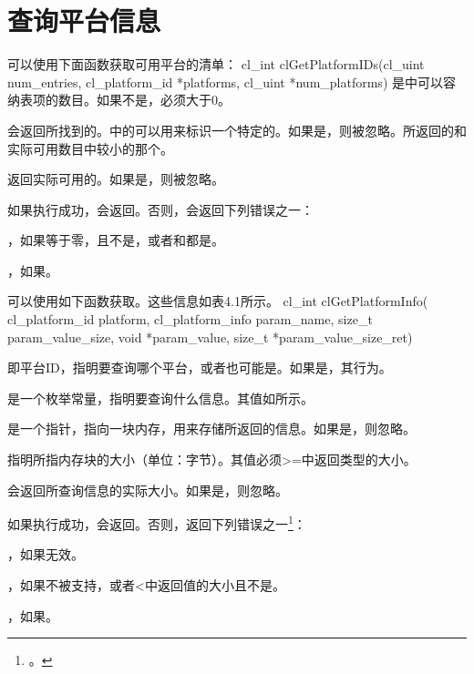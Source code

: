 \section{查询平台信息}
可以使用下面函数获取可用平台的清单：
\startclc
cl_int clGetPlatformIDs(cl_uint num_entries,
			cl_platform_id *platforms,
			cl_uint *num_platforms)
\stopclc
{}是中可以容纳表项的数目。如果不是，必须大于0。

会返回所找到的。中的可以用来标识一个特定的。如果是，则被忽略。所返回的和实际可用数目中较小的那个。

返回实际可用的。如果是，则被忽略。

如果执行成功，会返回。否则，会返回下列错误之一：
\startigBase
\item {}，如果等于零，且不是，或者和都是。
\item {}，如果\schostfailres。
\stopigBase

可以使用如下函数获取。这些信息如表4.1所示。
\startclc
cl_int clGetPlatformInfo(
		cl_platform_id platform,
		cl_platform_info param_name,
		size_t param_value_size,
		void *param_value,
		size_t *param_value_size_ret)
\stopclc

即平台ID，指明要查询哪个平台，或者也可能是。如果是，其行为。

是一个枚举常量，指明要查询什么信息。其值如所示。

是一个指针，指向一块内存，用来存储所返回的信息。如果是，则忽略。

指明所指内存块的大小（单位：字节）。其值必须>=中返回类型的大小。

会返回所查询信息的实际大小。如果是，则忽略。

\cltable
{}
{}

如果执行成功，会返回。否则，返回下列错误之一\footnote{。}：
\startigBase
\item {}，如果无效。
\item {}，如果不被支持，或者<中返回值的大小且不是。
\item {}，如果\schostfailres。
\stopigBase
